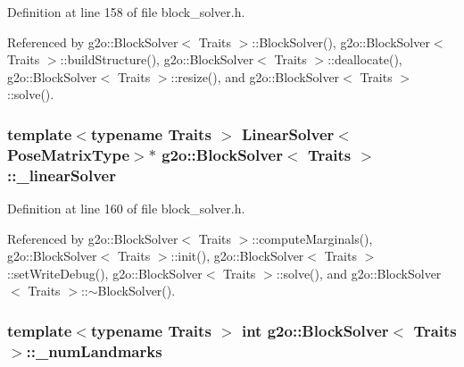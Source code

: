 Definition at line 158 of file block\+\_\+solver.\+h.



Referenced by g2o\+::\+Block\+Solver$<$ Traits $>$\+::\+Block\+Solver(), g2o\+::\+Block\+Solver$<$ Traits $>$\+::build\+Structure(), g2o\+::\+Block\+Solver$<$ Traits $>$\+::deallocate(), g2o\+::\+Block\+Solver$<$ Traits $>$\+::resize(), and g2o\+::\+Block\+Solver$<$ Traits $>$\+::solve().

\subsubsection[{\texorpdfstring{\+\_\+linear\+Solver}{_linearSolver}}]{\setlength{\rightskip}{0pt plus 5cm}template$<$typename Traits $>$ {\bf Linear\+Solver}$<${\bf Pose\+Matrix\+Type}$>$$\ast$ {\bf g2o\+::\+Block\+Solver}$<$ Traits $>$\+::\+\_\+linear\+Solver\hspace{0.3cm}{\ttfamily [protected]}}\hypertarget{classg2o_1_1BlockSolver_a676a4ef473ccaecb23050284e19659af}{}\label{classg2o_1_1BlockSolver_a676a4ef473ccaecb23050284e19659af}


Definition at line 160 of file block\+\_\+solver.\+h.



Referenced by g2o\+::\+Block\+Solver$<$ Traits $>$\+::compute\+Marginals(), g2o\+::\+Block\+Solver$<$ Traits $>$\+::init(), g2o\+::\+Block\+Solver$<$ Traits $>$\+::set\+Write\+Debug(), g2o\+::\+Block\+Solver$<$ Traits $>$\+::solve(), and g2o\+::\+Block\+Solver$<$ Traits $>$\+::$\sim$\+Block\+Solver().

\subsubsection[{\texorpdfstring{\+\_\+num\+Landmarks}{_numLandmarks}}]{\setlength{\rightskip}{0pt plus 5cm}template$<$typename Traits $>$ int {\bf g2o\+::\+Block\+Solver}$<$ Traits $>$\+::\+\_\+num\+Landmarks\hspace{0.3cm}{\ttfamily [protected]}}\hypertarget{classg2o_1_1BlockSolver_ab98231b7ca8e6d7f138c33d26c6f4326}{}\label{classg2o_1_1BlockSolver_ab98231b7ca8e6d7f138c33d26c6f4326}


